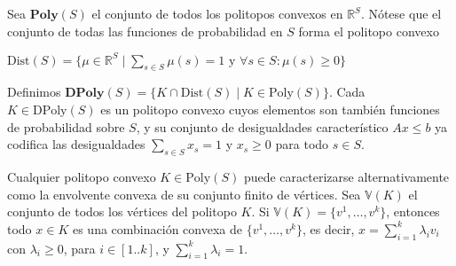 Sea \( \textbf{Poly}(S) \) el conjunto de todos los politopos convexos en \(
\mathbb{R}^S \). Nótese que el conjunto de todas las funciones de probabilidad
en \( S \) forma el politopo convexo

\( \text{Dist}(S) = \{ \mu \in \mathbb{R}^S \mid \sum_{s \in S} \mu(s) = 1 \text{ y } \forall s \in S : \mu(s) \geq 0 \} \)

Definimos \( \textbf{DPoly}(S) = \{ K \cap \text{Dist}(S) \mid K \in
\text{Poly}(S) \} \). Cada \( K \in \text{DPoly}(S) \) es un politopo convexo
cuyos elementos son también funciones de probabilidad sobre \( S \), y su
conjunto de desigualdades característico \( Ax \leq b \) ya codifica las
desigualdades \( \sum_{s \in S} x_s = 1 \) y \( x_s \geq 0 \) para todo \( s
\in S \).

Cualquier politopo convexo \( K \in \text{Poly}(S) \) puede caracterizarse
alternativamente como la envolvente convexa de su conjunto finito de vértices.
Sea \( \mathbb{V}(K) \) el conjunto de todos los vértices del politopo \( K \).
Si \( \mathbb{V}(K) = \{v^1, \dots, v^k\} \), entonces todo \( x \in K \) es
una combinación convexa de \( \{v^1, \dots, v^k\} \), es decir, \( x =
\sum_{i=1}^{k} \lambda_i v_i \) con \( \lambda_i \geq 0 \), para \( i \in
[1..k] \), y \( \sum_{i=1}^{k} \lambda_i = 1 \).





